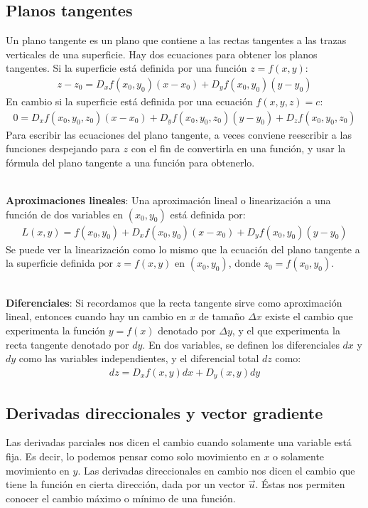 \documentclass[12pt, letterpaper]{report}
\begin{document}
\subsection*{Planos tangentes}
Un plano tangente es un plano que contiene a las rectas tangentes a las trazas verticales de una superficie. Hay dos ecuaciones para obtener los planos tangentes. 
Si la superficie está definida por una función $z = f(x, y)$: 
\begin{align}
z-z_0 = D_xf(x_0, y_0)(x-x_0) + D_yf(x_0, y_0)(y-y_0)
\end{align}
En cambio si la superficie está definida por una ecuación $f(x, y, z) = c$: 
\begin{align}
0 = D_xf(x_0, y_0, z_0)(x-x_0) + D_yf(x_0, y_0, z_0)(y-y_0) + D_zf(x_0, y_0, z_0)
\end{align}
Para escribir las ecuaciones del plano tangente, a veces conviene reescribir a las funciones despejando para $z$ con el fin de convertirla en 
una función, y usar la fórmula del plano tangente a una función para obtenerlo. \\ 

\textbf{Aproximaciones lineales}: Una aproximación lineal o linearización a una función de dos variables en $(x_0, y_0)$ está definida por: 
\begin{align}
L(x, y) = f(x_0, y_0) + D_xf(x_0, y_0)(x-x_0) + D_yf(x_0, y_0)(y-y_0)
\end{align}Se puede ver la linearización como lo mismo que la ecuación del plano tangente a la superficie 
definida por $z = f(x, y)$ en $(x_0, y_0)$, donde $z_0 = f(x_0, y_0)$. \\ 

\textbf{Diferenciales}: Si recordamos que la recta tangente sirve como aproximación lineal, entonces cuando hay un cambio en $x$ de tamaño 
$\Delta  x$ existe el cambio que experimenta la función $y = f(x)$ denotado por $\Delta y$, y el que experimenta la 
recta tangente denotado por $dy$. En dos variables, se definen los diferenciales $dx$ y $dy$ como las variables independientes, y el diferencial total $dz$ como: 
\begin{align}
dz = D_xf(x, y)dx + D_y(x, y)dy
\end{align}

\subsection*{Derivadas direccionales y vector gradiente}
Las derivadas parciales nos dicen el cambio cuando solamente una variable está fija. Es decir, lo podemos pensar como solo movimiento en $x$ o 
solamente movimiento en $y$. Las derivadas direccionales en cambio nos dicen el cambio que tiene la función en cierta dirección, dada por un vector 
$\vec{u}$. Éstas nos permiten conocer el cambio máximo o mínimo de una función.\\
\end{document}
